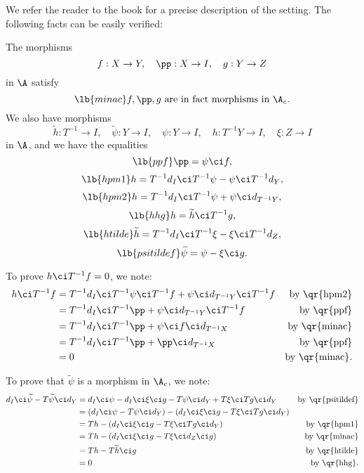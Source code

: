 \documentclass[12pt]{article}
\theoremstyle{remark}
\theoremstyle{definition}
\begin{document}
We refer the reader to the book for a precise description of the setting. The following facts can be easily verified: 

The morphisms 
$$
f:X\to Y,\quad\pp:X\to I,\quad g:Y\to Z
$$ 
in $\A$ satisfy 
%
\begin{equation}\lb{minac}
f,\pp,g\text{ are in fact morphisms in }\A_c.
\end{equation}
%
We also have morphisms 
$$
\widetilde h:T^{-1}\to I,\quad\widetilde\psi:Y\to I,\quad\psi:Y\to I,\quad h:T^{-1}Y\to I,\quad\xi:Z\to I
$$ 
in $\A$, and we have the equalities 
%
\begin{equation}\lb{ppf}
\pp=\psi\ci f,
\end{equation}
%
\begin{equation}\lb{hpm1}
h=T^{-1}d_I\ci T^{-1}\psi-\psi\ci T^{-1}d_Y,
\end{equation}
%
\begin{equation}\lb{hpm2}
h=T^{-1}d_I\ci T^{-1}\psi+\psi\ci d_{T^{-1}Y},
\end{equation}
%
\begin{equation}\lb{hhg}
h=\widetilde h\ci T^{-1}g,
\end{equation}
%
\begin{equation}\lb{htilde}
\widetilde h=T^{-1}d_I\ci T^{-1}\xi-\xi\ci T^{-1}d_Z,
\end{equation}
%
\begin{equation}\lb{psitildef}
\widetilde\psi=\psi-\xi\ci g. 
\end{equation}

To prove $h\ci T^{-1}f=0$, we note: 
%
\begin{align*}
h\ci T^{-1}f&=T^{-1}d_I\ci T^{-1}\psi\ci T^{-1}f+\psi\ci d_{T^{-1}Y}\ci T^{-1}f&\text{by \qr{hpm2}}\\ 
&=T^{-1}d_I\ci T^{-1}\pp+\psi\ci d_{T^{-1}Y}\ci T^{-1}f&\text{by \qr{ppf}}\\ 
&=T^{-1}d_I\ci T^{-1}\pp+\psi\ci f\ci d_{T^{-1}X}&\text{by \qr{minac}}\\ 
&=T^{-1}d_I\ci T^{-1}\pp+\pp\ci d_{T^{-1}X}&\text{by \qr{ppf}}\\ 
&=0&\text{by \qr{minac}}. 
\end{align*}

To prove that $\widetilde\psi$ is a morphism in $\A_c$, we note: 
%
\begin{align*}
d_I\ci\widetilde\psi-T\widetilde\psi\ci d_Y&=d_I\ci\psi-d_I\ci\xi\ci g-T\psi\ci d_Y+T\xi\ci Tg\ci d_Y&\text{by \qr{psitildef}}\\ 
&=(d_I\ci\psi-T\psi\ci d_Y)-(d_I\ci\xi\ci g-T\xi\ci Tg\ci d_Y)\\ 
&=Th-(d_I\ci\xi\ci g-T\xi\ci Tg\ci d_Y)&\text{by \qr{hpm1}}\\ 
&=Th-(d_I\ci\xi\ci g-T\xi\ci d_Z\ci g)&\text{by \qr{minac}}\\ 
&=Th-T\widetilde h\ci g&\text{by \qr{htilde}}\\ 
&=0&\text{by \qr{hhg}}. 
\end{align*}
\end{document}
